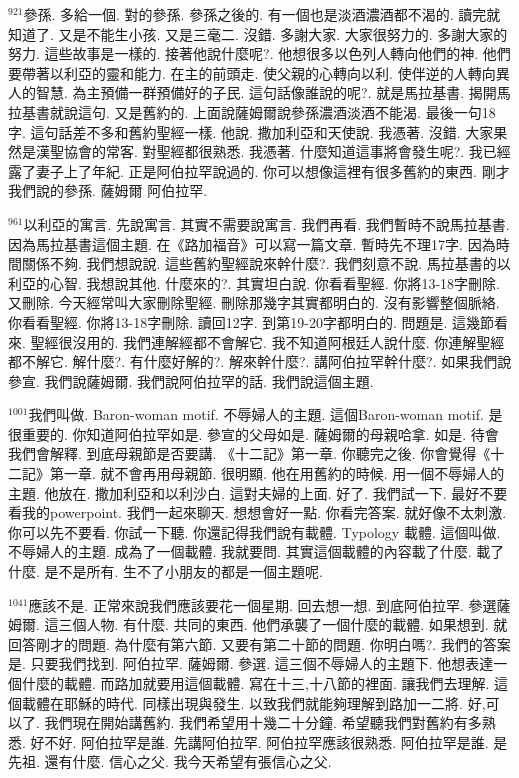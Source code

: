 \documentclass{book}
\begin{document}
$^{921}$參孫.
多給一個.
對的參孫.
參孫之後的.
有一個也是淡酒濃酒都不渴的.
讀完就知道了.
又是不能生小孩.
又是三毫二.
沒錯.
多謝大家.
大家很努力的.
多謝大家的努力.
這些故事是一樣的.
接著他說什麼呢?.
他想很多以色列人轉向他們的神.
他們要帶著以利亞的靈和能力.
在主的前頭走.
使父親的心轉向以利.
使伴逆的人轉向異人的智慧.
為主預備一群預備好的子民.
這句話像誰說的呢?.
就是馬拉基書.
揭開馬拉基書就說這句.
又是舊約的.
上面說薩姆爾說參孫濃酒淡酒不能渴.
最後一句18字.
這句話差不多和舊約聖經一樣.
他說.
撒加利亞和天使說.
我憑著.
沒錯.
大家果然是漢聖協會的常客.
對聖經都很熟悉.
我憑著.
什麼知道這事將會發生呢?.
我已經露了妻子上了年紀.
正是阿伯拉罕說過的.
你可以想像這裡有很多舊約的東西.
剛才我們說的參孫.
薩姆爾 阿伯拉罕.

$^{961}$以利亞的寓言.
先說寓言.
其實不需要說寓言.
我們再看.
我們暫時不說馬拉基書.
因為馬拉基書這個主題.
在《路加福音》可以寫一篇文章.
暫時先不理17字.
因為時間關係不夠.
我們想說說.
這些舊約聖經說來幹什麼?.
我們刻意不說.
馬拉基書的以利亞的心智.
我想說其他.
什麼來的?.
其實坦白說.
你看看聖經.
你將13-18字刪除.
又刪除.
今天經常叫大家刪除聖經.
刪除那幾字其實都明白的.
沒有影響整個脈絡.
你看看聖經.
你將13-18字刪除.
讀回12字.
到第19-20字都明白的.
問題是.
這幾節看來.
聖經很沒用的.
我們連解經都不會解它.
我不知道阿根廷人說什麼.
你連解聖經都不解它.
解什麼?.
有什麼好解的?.
解來幹什麼?.
講阿伯拉罕幹什麼?.
如果我們說參宣.
我們說薩姆爾.
我們說阿伯拉罕的話.
我們說這個主題.

$^{1001}$我們叫做.
Baron-woman motif.
不辱婦人的主題.
這個Baron-woman motif.
是很重要的.
你知道阿伯拉罕如是.
參宣的父母如是.
薩姆爾的母親哈拿.
如是.
待會我們會解釋.
到底母親節是否要講.
《十二記》第一章.
你聽完之後.
你會覺得《十二記》第一章.
就不會再用母親節.
很明顯.
他在用舊約的時候.
用一個不辱婦人的主題.
他放在.
撒加利亞和以利沙白.
這對夫婦的上面.
好了.
我們試一下.
最好不要看我的powerpoint.
我們一起來聊天.
想想會好一點.
你看完答案.
就好像不太刺激.
你可以先不要看.
你試一下聽.
你還記得我們說有載體.
Typology 載體.
這個叫做.
不辱婦人的主題.
成為了一個載體.
我就要問.
其實這個載體的內容載了什麼.
載了什麼.
是不是所有.
生不了小朋友的都是一個主題呢.

$^{1041}$應該不是.
正常來說我們應該要花一個星期.
回去想一想.
到底阿伯拉罕.
參選薩姆爾.
這三個人物.
有什麼.
共同的東西.
他們承襲了一個什麼的載體.
如果想到.
就回答剛才的問題.
為什麼有第六節.
又要有第二十節的問題.
你明白嗎?.
我們的答案是.
只要我們找到.
阿伯拉罕.
薩姆爾.
參選.
這三個不辱婦人的主題下.
他想表達一個什麼的載體.
而路加就要用這個載體.
寫在十三,十八節的裡面.
讓我們去理解.
這個載體在耶穌的時代.
同樣出現與發生.
以致我們就能夠理解到路加一二將.
好,可以了.
我們現在開始講舊約.
我們希望用十幾二十分鐘.
希望聽我們對舊約有多熟悉.
好不好.
阿伯拉罕是誰.
先講阿伯拉罕.
阿伯拉罕應該很熟悉.
阿伯拉罕是誰.
是先祖.
還有什麼.
信心之父.
我今天希望有張信心之父.
\end{document}
